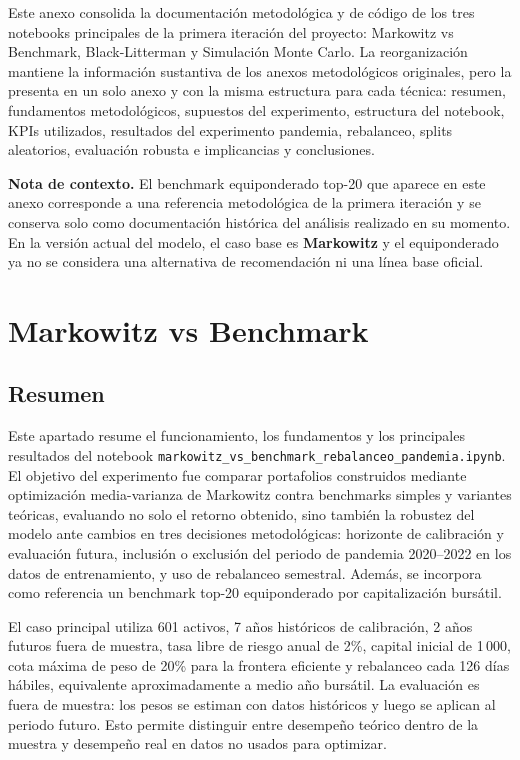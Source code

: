 Este anexo consolida la documentaci\'on metodol\'ogica y de c\'odigo de los tres
notebooks principales de la primera iteraci\'on del proyecto: Markowitz vs
Benchmark, Black-Litterman y Simulaci\'on Monte Carlo. La reorganizaci\'on
mantiene la informaci\'on sustantiva de los anexos metodol\'ogicos originales,
pero la presenta en un solo anexo y con la misma estructura para cada t\'ecnica:
resumen, fundamentos metodol\'ogicos, supuestos del experimento, estructura del
notebook, KPIs utilizados, resultados del experimento pandemia, rebalanceo,
splits aleatorios, evaluaci\'on robusta e implicancias y conclusiones.

\medskip
\noindent\textbf{Nota de contexto.} El benchmark equiponderado top-20 que
aparece en este anexo corresponde a una referencia metodol\'ogica de la primera
iteraci\'on y se conserva solo como documentaci\'on hist\'orica del an\'alisis
realizado en su momento. En la versi\'on actual del modelo, el caso base es
\textbf{Markowitz} y el equiponderado ya no se considera una alternativa de
recomendaci\'on ni una l\'inea base oficial.

\section*{Markowitz vs Benchmark}

\subsection*{Resumen}

Este apartado resume el funcionamiento, los fundamentos y los principales
resultados del notebook
\texttt{markowitz\_vs\_benchmark\_rebalanceo\_pandemia.ipynb}. El objetivo del
experimento fue comparar portafolios construidos mediante optimizaci\'on
media-varianza de Markowitz contra benchmarks simples y variantes te\'oricas,
evaluando no solo el retorno obtenido, sino tambi\'en la robustez del modelo ante
cambios en tres decisiones metodol\'ogicas: horizonte de calibraci\'on y
evaluaci\'on futura, inclusi\'on o exclusi\'on del periodo de pandemia 2020--2022
en los datos de entrenamiento, y uso de rebalanceo semestral. Adem\'as, se
incorpora como referencia un benchmark top-20 equiponderado por capitalizaci\'on
burs\'atil.

El caso principal utiliza 601 activos, 7 a\~nos hist\'oricos de calibraci\'on,
2 a\~nos futuros fuera de muestra, tasa libre de riesgo anual de 2\%, capital
inicial de 1\,000, cota m\'axima de peso de 20\% para la frontera eficiente y
rebalanceo cada 126 d\'ias h\'abiles, equivalente aproximadamente a medio a\~no
burs\'atil. La evaluaci\'on es fuera de muestra: los pesos se estiman con datos
hist\'oricos y luego se aplican al periodo futuro. Esto permite distinguir entre
desempe\~no te\'orico dentro de la muestra y desempe\~no real en datos no usados
para optimizar.

